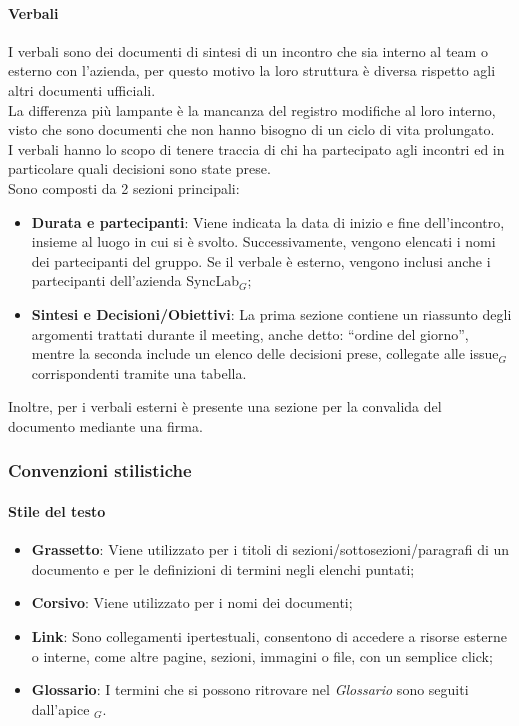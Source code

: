 \documentclass[10pt]{article}
\begin{document}
\begin{justify}
        \paragraph{Verbali}
        I verbali sono dei documenti di sintesi di un incontro che sia interno al team o esterno con l'azienda, per questo motivo la loro struttura è diversa rispetto agli altri documenti ufficiali.\\
        La differenza più lampante è la mancanza del registro modifiche al loro interno, visto che sono documenti che non hanno bisogno di un ciclo di vita prolungato.\\
        I verbali hanno lo scopo di tenere traccia di chi ha partecipato agli incontri ed in particolare quali decisioni sono state prese.\\
        Sono composti da 2 sezioni principali:
        \begin{itemize}
            \item \textbf{Durata e partecipanti}: Viene indicata la data di inizio e fine dell'incontro, insieme al luogo in cui si è svolto. Successivamente, vengono elencati i nomi dei partecipanti del gruppo. Se il verbale è esterno, vengono inclusi anche i partecipanti dell'azienda SyncLab$_G$;
            \item \textbf{Sintesi e Decisioni/Obiettivi}: La prima sezione contiene un riassunto degli argomenti trattati durante il meeting, anche detto: ``ordine del giorno'', mentre la seconda include un elenco delle decisioni prese, collegate alle issue$_G$ corrispondenti tramite una tabella.
        \end{itemize}
        Inoltre, per i verbali esterni è presente una sezione per la convalida del documento mediante una firma.\\

    \subsubsection{Convenzioni stilistiche}
        \paragraph{Stile del testo}
        \begin{itemize}
            \item \textbf{Grassetto}: Viene utilizzato per i titoli di sezioni/sottosezioni/paragrafi di un documento e per le definizioni di termini negli elenchi puntati;
            \item \textbf{Corsivo}: Viene utilizzato per i nomi dei documenti;
            \item \textbf{Link}: Sono collegamenti ipertestuali, consentono di accedere a risorse esterne o interne, come altre pagine, sezioni, immagini o file, con un semplice click;
            \item \textbf{Glossario}: I termini che si possono ritrovare nel \textit{Glossario} sono seguiti dall'apice $_G$.
        \end{itemize}


\end{justify}
\end{document}
